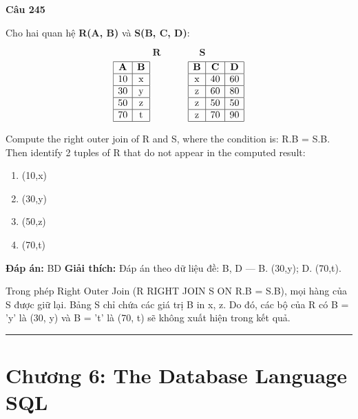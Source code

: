 \documentclass[11pt,a4paper]{article}
\newenvironment{question}[1]{%
  \par\vspace{1em}\noindent\textbf{\large Câu #1}\par\vspace{0.4em}
}{%
  \par\vspace{1em}\hrule\vspace{0.6em}
}
\newenvironment{choices}{%
  \begin{enumerate}[label=\textbf{\Alph*.},leftmargin=2.2em,itemsep=2pt,topsep=3pt]
}{%
  \end{enumerate}
}
\newcommand{\choice}{\item}
\begin{document}
\begin{question}{245}
Cho hai quan hệ \textbf{R(A, B)} và \textbf{S(B, C, D)}:

$$\textbf{R} \qquad\qquad \textbf{S}$$
$$\begin{array}{|c|c|}
\hline
\textbf{A} & \textbf{B} \\
\hline
10 & \text{x} \\
\hline
30 & \text{y} \\
\hline
50 & \text{z} \\
\hline
70 & \text{t} \\
\hline
\end{array}
\qquad\qquad
\begin{array}{|c|c|c|}
\hline
\textbf{B} & \textbf{C} & \textbf{D} \\
\hline
\text{x} & 40 & 60 \\
\hline
\text{z} & 60 & 80 \\
\hline
\text{z} & 50 & 50 \\
\hline
\text{z} & 70 & 90 \\
\hline
\end{array}$$

Compute the right outer join of R and S, where the condition is: R.B = S.B.
Then identify 2 tuples of R that do not appear in the computed result:
\begin{choices}
\choice (10,x)
\choice (30,y)
\choice (50,z)
\choice (70,t)
\end{choices}
\textbf{Đáp án:} BD
\textbf{Giải thích:} Đáp án theo dữ liệu đề: B, D — B. (30,y); D. (70,t).

Trong phép Right Outer Join (R RIGHT JOIN S ON R.B = S.B), mọi hàng của S được giữ lại. Bảng S chỉ chứa các giá trị B in {x, z}. Do đó, các bộ của R có B = 'y' là (30, y) và B = 't' là (70, t) sẽ không xuất hiện trong kết quả.
\end{question}


\newpage
\section*{Chương 6: The Database Language SQL}
\end{document}
